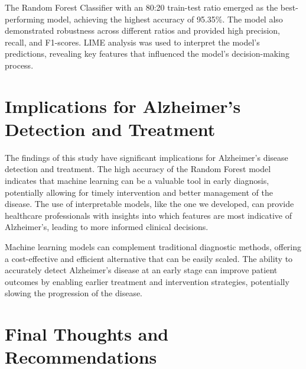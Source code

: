 \documentclass[a4paper,12pt]{report}
\begin{document}
The Random Forest Classifier with an 80:20 train-test ratio emerged as the best-performing model, achieving the highest accuracy of 95.35\%. The model also demonstrated robustness across different ratios and provided high precision, recall, and F1-scores. LIME analysis was used to interpret the model's predictions, revealing key features that influenced the model's decision-making process.

\section{Implications for Alzheimer’s Detection and Treatment}

The findings of this study have significant implications for Alzheimer's disease detection and treatment. The high accuracy of the Random Forest model indicates that machine learning can be a valuable tool in early diagnosis, potentially allowing for timely intervention and better management of the disease. The use of interpretable models, like the one we developed, can provide healthcare professionals with insights into which features are most indicative of Alzheimer's, leading to more informed clinical decisions.

Machine learning models can complement traditional diagnostic methods, offering a cost-effective and efficient alternative that can be easily scaled. The ability to accurately detect Alzheimer's disease at an early stage can improve patient outcomes by enabling earlier treatment and intervention strategies, potentially slowing the progression of the disease.

\section{Final Thoughts and Recommendations}
\end{document}
